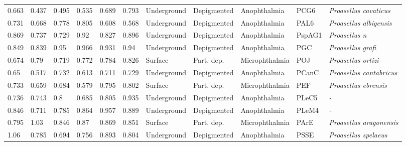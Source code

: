 \begin{tabular}{lllllllllll}
          0.663 &           0.437 &           0.495 &           0.535 &           0.689 &           0.793 &  Underground &  Depigmented &     Anophthalmia &     PCG6 &            \textit{Proasellus cavaticus} \\
          0.731 &           0.668 &           0.778 &           0.805 &           0.608 &           0.568 &  Underground &  Depigmented &     Anophthalmia &     PAL6 &           \textit{Proasellus albigensis} \\
          0.869 &           0.737 &           0.729 &            0.92 &           0.827 &           0.896 &  Underground &  Depigmented &     Anophthalmia &   PspAG1 &                    \textit{Proasellus n} \\
          0.849 &           0.839 &            0.95 &           0.966 &           0.931 &            0.94 &  Underground &  Depigmented &     Anophthalmia &      PGC &                \textit{Proasellus grafi} \\
          0.674 &            0.79 &           0.719 &           0.772 &           0.784 &           0.826 &      Surface &   Part. dep. &   Microphthalmia &      POJ &               \textit{Proasellus ortizi} \\
           0.65 &           0.517 &           0.732 &           0.613 &           0.711 &           0.729 &  Underground &  Depigmented &     Anophthalmia &    PCanC &          \textit{Proasellus cantabricus} \\
          0.733 &           0.659 &           0.684 &           0.579 &           0.795 &           0.802 &      Surface &   Part. dep. &   Microphthalmia &      PEF &             \textit{Proasellus ebrensis} \\
          0.736 &           0.743 &             0.8 &           0.685 &           0.805 &           0.935 &  Underground &  Depigmented &     Anophthalmia &    PLeC5 &                               \textit{-} \\
          0.846 &           0.711 &           0.785 &           0.864 &           0.957 &           0.889 &  Underground &  Depigmented &     Anophthalmia &    PLeM4 &                               \textit{-} \\
          0.795 &            1.03 &           0.846 &            0.87 &           0.869 &           0.851 &      Surface &   Part. dep. &   Microphthalmia &     PArE &          \textit{Proasellus aragonensis} \\
           1.06 &           0.785 &           0.694 &           0.756 &           0.893 &           0.804 &  Underground &  Depigmented &     Anophthalmia &     PSSE &             \textit{Proasellus spelaeus} \\

\end{tabular}
